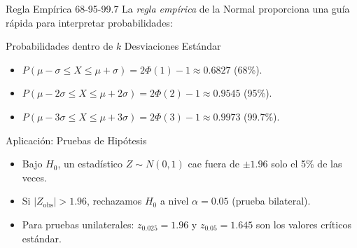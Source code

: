 \documentclass[10pt, aspectratio=169]{beamer}
\begin{document}
\begin{frame}{Regla Empírica 68-95-99.7}
  \footnotesize
  La \emph{regla empírica} de la Normal proporciona una guía rápida para interpretar probabilidades: \pause

  \vspace{0.1cm}
  \begin{block}{Probabilidades dentro de $k$ Desviaciones Estándar}
    \begin{itemize}\itemsep=0.06cm
      \item $P(\mu - \sigma \le X \le \mu + \sigma) = 2\Phi(1) - 1 \approx 0.6827$ (68\%).
      \item $P(\mu - 2\sigma \le X \le \mu + 2\sigma) = 2\Phi(2) - 1 \approx 0.9545$ (95\%).
      \item $P(\mu - 3\sigma \le X \le \mu + 3\sigma) = 2\Phi(3) - 1 \approx 0.9973$ (99.7\%).
    \end{itemize}
  \end{block}

  \vspace{0.1cm}
  \pause
  \begin{alertblock}{Aplicación: Pruebas de Hipótesis}
    \begin{itemize}\itemsep=0.05cm
      \item Bajo $H_{0}$, un estadístico $Z \sim N(0, 1)$ cae fuera de $\pm 1.96$ solo el 5\% de las veces.
      \item Si $|Z_{\text{obs}}| > 1.96$, rechazamos $H_{0}$ a nivel $\alpha = 0.05$ (prueba bilateral).
      \item Para pruebas unilaterales: $z_{0.025} = 1.96$ y $z_{0.05} = 1.645$ son los valores críticos estándar.
    \end{itemize}
  \end{alertblock}
\end{frame}
\end{document}
